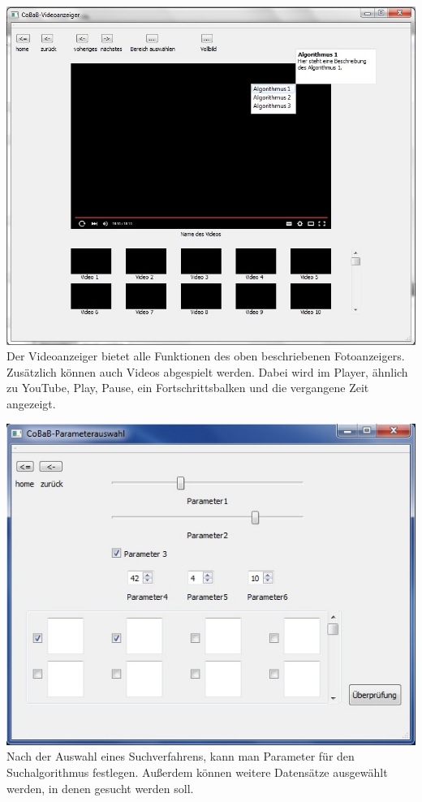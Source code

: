 \includegraphics[width=1\linewidth]{img/Videoanzeiger}
Der Videoanzeiger bietet alle Funktionen des oben beschriebenen Fotoanzeigers. Zusätzlich können auch Videos abgespielt werden. Dabei wird im Player, ähnlich zu YouTube, Play, Pause, ein Fortschrittsbalken und die vergangene Zeit angezeigt. 

\includegraphics[width=1\linewidth]{img/Parameterauswahl}
Nach der Auswahl eines Suchverfahrens, kann man Parameter für den Suchalgorithmus festlegen. Außerdem können weitere Datensätze ausgewählt werden, in denen gesucht werden soll.


